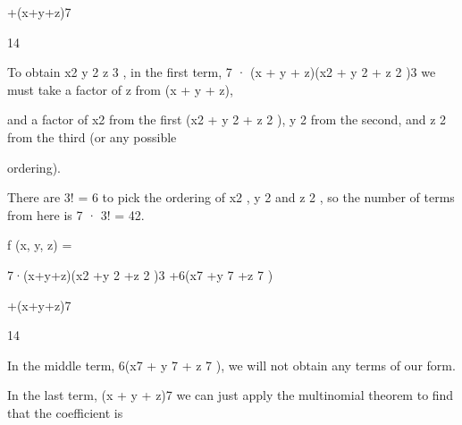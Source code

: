 \documentclass[a4paper,portrait,12pt]{article}
\begin{document}
\begin{flushleft}
+(x+y+z)7
\end{flushleft}





14





\begin{flushleft}
To obtain x2 y 2 z 3 , in the first term, 7 · (x + y + z)(x2 + y 2 + z 2 )3 we must take a factor of z from (x + y + z),
\end{flushleft}


\begin{flushleft}
and a factor of x2 from the first (x2 + y 2 + z 2 ), y 2 from the second, and z 2 from the third (or any possible
\end{flushleft}


\begin{flushleft}
ordering).
\end{flushleft}


\begin{flushleft}
There are 3! = 6 to pick the ordering of x2 , y 2 and z 2 , so the number of terms from here is 7 · 3! = 42.
\end{flushleft}





\begin{flushleft}
f (x, y, z) =
\end{flushleft}





\begin{flushleft}
7·(x+y+z)(x2 +y 2 +z 2 )3 +6(x7 +y 7 +z 7 )
\end{flushleft}


\begin{flushleft}
+(x+y+z)7
\end{flushleft}





14





\begin{flushleft}
In the middle term, 6(x7 + y 7 + z 7 ), we will not obtain any terms of our form.
\end{flushleft}


\begin{flushleft}
In the last term, (x + y + z)7 we can just apply the multinomial theorem to find that the coefficient is
\end{flushleft}
\end{document}
